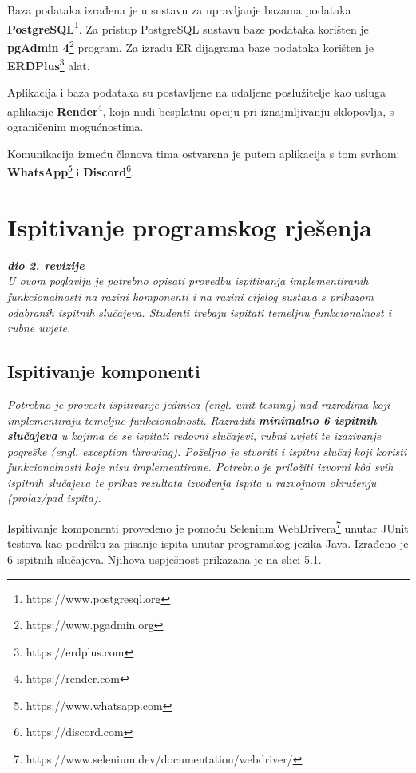 			Baza podataka izrađena je u sustavu za upravljanje bazama podataka \textbf{PostgreSQL}\footnote{https://www.postgresql.org}. Za pristup PostgreSQL sustavu baze podataka korišten je \textbf{pgAdmin 4}\footnote{https://www.pgadmin.org} program. Za izradu ER dijagrama baze podataka korišten je \textbf{ERDPlus}\footnote{https://erdplus.com} alat.
			
			Aplikacija i baza podataka su postavljene na udaljene poslužitelje kao usluga aplikacije \textbf{Render}\footnote{https://render.com}, koja nudi besplatnu opciju pri iznajmljivanju sklopovlja, s ograničenim mogućnostima.
			
			Komunikacija između članova tima ostvarena je putem aplikacija s tom svrhom: \textbf{WhatsApp}\footnote{https://www.whatsapp.com} i \textbf{Discord}\footnote{https://discord.com}.
			
			\eject 
		
	
		\section{Ispitivanje programskog rješenja}
			
			\textbf{\textit{dio 2. revizije}}\\
			
			 \textit{U ovom poglavlju je potrebno opisati provedbu ispitivanja implementiranih funkcionalnosti na razini komponenti i na razini cijelog sustava s prikazom odabranih ispitnih slučajeva. Studenti trebaju ispitati temeljnu funkcionalnost i rubne uvjete.}
			 
			
			\subsection{Ispitivanje komponenti}
			\textit{Potrebno je provesti ispitivanje jedinica (engl. unit testing) nad razredima koji implementiraju temeljne funkcionalnosti. Razraditi \textbf{minimalno 6 ispitnih slučajeva} u kojima će se ispitati redovni slučajevi, rubni uvjeti te izazivanje pogreške (engl. exception throwing). Poželjno je stvoriti i ispitni slučaj koji koristi funkcionalnosti koje nisu implementirane. Potrebno je priložiti izvorni kôd svih ispitnih slučajeva te prikaz rezultata izvođenja ispita u razvojnom okruženju (prolaz/pad ispita). }
			
			Ispitivanje komponenti provedeno je pomoću Selenium WebDrivera\footnote{https://www.selenium.dev/documentation/webdriver/} unutar JUnit testova kao podršku za pisanje ispita unutar programskog jezika Java.
			Izrađeno je 6 ispitnih slučajeva. Njihova uspješnost prikazana je na slici 5.1.
			
